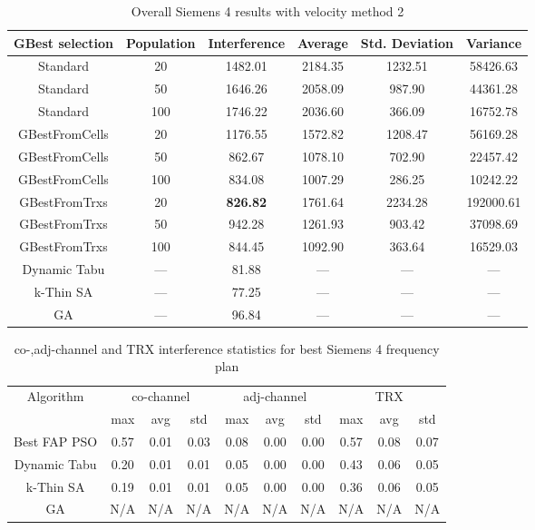 \begin{table}[H]
\centering
	\begin{tabular}{cccccc}
	\toprule
    GBest selection & Population & Interference & Average & Std. Deviation & Variance \\
    \midrule
    Standard & 20 & 1482.01 & 2184.35 & 1232.51 & 58426.63\\
    Standard & 50 & 1646.26 & 2058.09 & 987.90 & 44361.28\\
    Standard & 100 & 1746.22 & 2036.60 & 366.09 & 16752.78\\
    GBestFromCells & 20 & 1176.55 & 1572.82 & 1208.47 & 56169.28\\
    GBestFromCells & 50 & 862.67 & 1078.10 & 702.90 & 22457.42\\
    GBestFromCells & 100 & 834.08 & 1007.29 & 286.25 & 10242.22\\
    GBestFromTrxs & 20 & \textbf{826.82} & 1761.64 & 2234.28 & 192000.61\\
    GBestFromTrxs & 50 & 942.28 & 1261.93 & 903.42 & 37098.69\\
    GBestFromTrxs & 100 & 844.45 & 1092.90 & 363.64 & 16529.03\\
    \midrule
    Dynamic Tabu & --- & 81.88 & --- & --- & --- \\
    k-Thin SA & --- & 77.25 & --- & ---  & ---\\
    GA & --- & 96.84 & --- & ---  & ---\\
    \bottomrule
	\end{tabular}
\caption{Overall Siemens 4 results with velocity method 2}
\label{tab:siem4m2}
\end{table}
\begin{table}[H]
\centering
	\begin{tabular}{cccccccccc}
	\toprule
    Algorithm & \multicolumn{3}{c}{co-channel} & \multicolumn{3}{c}{adj-channel} & \multicolumn{3}{c}{TRX}\\
              & max & avg & std
              & max & avg & std
              & max & avg & std\\
    \midrule
    Best FAP PSO & 0.57 & 0.01 & 0.03 & 0.08 & 0.00 & 0.00 & 0.57 & 0.08 & 0.07\\
    Dynamic Tabu & 0.20 & 0.01 & 0.01 & 0.05 & 0.00 & 0.00 & 0.43 & 0.06 & 0.05\\
    k-Thin SA & 0.19 & 0.01 & 0.01 & 0.05 & 0.00 & 0.00 & 0.36 & 0.06 & 0.05\\
    GA & \scriptsize{N/A} & \scriptsize{N/A} & \scriptsize{N/A} & \scriptsize{N/A} & \scriptsize{N/A} & \scriptsize{N/A} & \scriptsize{N/A} & \scriptsize{N/A} & \scriptsize{N/A}\\
    \bottomrule
	\end{tabular}
\caption{co-,adj-channel and TRX interference statistics for best Siemens 4 frequency plan}
\label{tab:stats-siem4m1}
\end{table}
